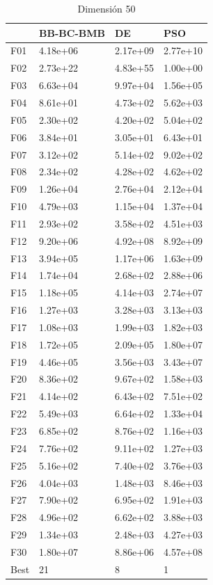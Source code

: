 \begin{table}[H]
    \begin{minipage}{.5\linewidth}
      \caption{Dimensión 50}
      \centering
      \begin{tabular}{llll}
        \toprule
        {} & BB-BC-BMB &        DE &       PSO \\
        \midrule
        F01  &  4.18e+06 &  2.17e+09 &  2.77e+10 \\
        F02  &  2.73e+22 &  4.83e+55 &  1.00e+00 \\
        F03  &  6.63e+04 &  9.97e+04 &  1.56e+05 \\
        F04  &  8.61e+01 &  4.73e+02 &  5.62e+03 \\
        F05  &  2.30e+02 &  4.20e+02 &  5.04e+02 \\
        F06  &  3.84e+01 &  3.05e+01 &  6.43e+01 \\
        F07  &  3.12e+02 &  5.14e+02 &  9.02e+02 \\
        F08  &  2.34e+02 &  4.28e+02 &  4.62e+02 \\
        F09  &  1.26e+04 &  2.76e+04 &  2.12e+04 \\
        F10  &  4.79e+03 &  1.15e+04 &  1.37e+04 \\
        F11  &  2.93e+02 &  3.58e+02 &  4.51e+03 \\
        F12  &  9.20e+06 &  4.92e+08 &  8.92e+09 \\
        F13  &  3.94e+05 &  1.17e+06 &  1.63e+09 \\
        F14  &  1.74e+04 &  2.68e+02 &  2.88e+06 \\
        F15  &  1.18e+05 &  4.14e+03 &  2.74e+07 \\
        F16  &  1.27e+03 &  3.28e+03 &  3.13e+03 \\
        F17  &  1.08e+03 &  1.99e+03 &  1.82e+03 \\
        F18  &  1.72e+05 &  2.09e+05 &  1.80e+07 \\
        F19  &  4.46e+05 &  3.56e+03 &  3.43e+07 \\
        F20  &  8.36e+02 &  9.67e+02 &  1.58e+03 \\
        F21  &  4.14e+02 &  6.43e+02 &  7.51e+02 \\
        F22  &  5.49e+03 &  6.64e+02 &  1.33e+04 \\
        F23  &  6.85e+02 &  8.76e+02 &  1.16e+03 \\
        F24  &  7.76e+02 &  9.11e+02 &  1.27e+03 \\
        F25  &  5.16e+02 &  7.40e+02 &  3.76e+03 \\
        F26  &  4.04e+03 &  1.48e+03 &  8.46e+03 \\
        F27  &  7.90e+02 &  6.95e+02 &  1.91e+03 \\
        F28  &  4.96e+02 &  6.62e+02 &  3.88e+03 \\
        F29  &  1.34e+03 &  2.48e+03 &  4.27e+03 \\
        F30  &  1.80e+07 &  8.86e+06 &  4.57e+08 \\
        Best &        21 &         8 &         1 \\
        \bottomrule
        \end{tabular}
        

\end{minipage}
\end{table}
